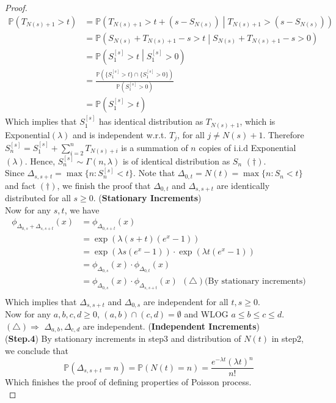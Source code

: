 \documentclass[a4paper, 10pt]{article}
\theoremstyle{definition}
\theoremstyle{hSol}
\begin{document}
\begin{proof}
\begin{equation}
  \begin{split}
    \mathbb{P}\left(T_{N(s)+1}>t\right) &= \mathbb{P}\left(T_{N(s)+1}>t+(s-S_{N(s)})\middle|T_{N(s)+1}>(s-S_{N(s)})\right) \\
    &= \mathbb{P}\left(S_{N(s)}+T_{N(s)+1}-s>t\middle|S_{N(s)}+T_{N(s)+1}-s>0\right) \\
    &= \mathbb{P}\left(S_{1}^{[s]}>t\middle|S_{1}^{[s]}>0\right)\\
    &= \frac{\mathbb{P}(\{S_{1}^{[s]}>t\}\cap \{S_{1}^{[s]}>0\})}{\mathbb{P}(S_{1}^{[s]}>0)} \\
    &= \mathbb{P}(S_{1}^{[s]}>t)
  \end{split}
\end{equation}
Which implies that $S_{1}^{[s]}$ has identical distribution as $T_{N(s)+1}$, which is Exponential$(\lambda)$ and is independent w.r.t. $T_{j}$, for all $j\ne N(s)+1$. Therefore $S_n^{[s]}=S_{1}^{[s]}+\sum_{i=2}^n T_{N(s)+i}$ is a summation of $n$ copies of i.i.d Exponential$(\lambda)$. Hence, $S_{n}^{[s]}\sim \Gamma(n, \lambda)$ is of identical distribution as $S_n$ $(\dag)$. \\
Since $\Delta_{s,s+t}=\max\{n: S_n^{[s]}<t\}$. Note that $\Delta_{0,t}=N(t)=\max\{n: S_n<t\}$ and fact $(\dag)$, we finish the proof that $\Delta_{0,t}$ and $\Delta_{s,s+t}$ are identically distributed for all $s\geq 0$. (\textbf{Stationary Increments})\\
Now for any $s,t$, we have
\begin{equation}
  \begin{split}
    \phi_{\Delta_{0,s}+\Delta_{s,s+t}}(x) &= \phi_{\Delta_{0,s+t}}(x) \\
    &= \exp(\lambda(s+t)(e^x-1)) \\
    &= \exp(\lambda s(e^x-1))\cdot \exp(\lambda t(e^x-1))\\
    &= \phi_{\Delta_{0,s}}(x)\cdot \phi_{\Delta_{0,t}}(x)\\
    &= \phi_{\Delta_{0,s}}(x)\cdot \phi_{\Delta_{s,s+t}}(x)~~(\triangle)\text{(By stationary increments)}\\
  \end{split}
\end{equation}
Which implies that $\Delta_{s,s+t}$ and $\Delta_{0,s}$ are independent for all $t,s\geq 0$. \\
Now for any $a,b,c,d\geq0$, $(a,b)\cap (c,d)=\emptyset$ and WLOG $a\leq b\leq c\leq d$. $(\triangle)\Rightarrow$ $\Delta_{a,b},\Delta_{c,d}$ are independent. (\textbf{Independent Increments})\\
(\textbf{Step.4}) By stationary increments in step3 and distribution of $N(t)$ in step2, we conclude that
\begin{equation}
  \mathbb{P}\left(\Delta_{s,s+t}=n\right)=\mathbb{P}\left(N(t)=n\right)=\frac{e^{-\lambda t}(\lambda t)^n}{n!}
\end{equation}
Which finishes the proof of defining properties of Poisson process.\\
\end{proof}
\end{document}
